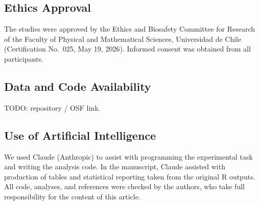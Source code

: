 \documentclass[man,floatsintext,donotrepeattitle]{apa7}
\begin{document}
\subsection*{Ethics Approval}

  The studies were approved by the Ethics and Biosafety Committee for Research of the Faculty of Physical and Mathematical Sciences, Universidad de Chile (Certification No.~025, May 19, 2026). Informed consent was obtained from all participants.

\subsection*{Data and Code Availability}

  TODO: repository / OSF link.

\subsection*{Use of Artificial Intelligence}

  We used Claude (Anthropic) to assist with programming the experimental task and writing the analysis code. In the manuscript, Claude assisted with production of tables and statistical reporting taken from the original R outputs. All code, analyses, and references were checked by the authors, who take full responsibility for the content of this article.

\printbibliography
\end{document}
